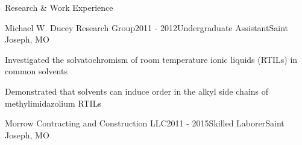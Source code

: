 \documentclass{resume} %
\begin{document}
\begin{rSection}{Research \& Work Experience}
\begin{rSubsection}{Michael W. Ducey Research Group}{2011 - 2012}{Undergraduate Assistant}{Saint Joseph, MO}
	\item Investigated the solvatochromism of room temperature ionic liquids (RTILs) in common solvents
	\item Demonstrated that solvents can induce order in the alkyl side chains of methylimidazolium RTILs
\end{rSubsection}

\begin{rSubsectionlistless}{Morrow Contracting and Construction LLC}{2011 - 2015}{Skilled Laborer}{Saint Joseph, MO}
\end{rSubsectionlistless}

\end{rSection}

\pagebreak
\end{document}
